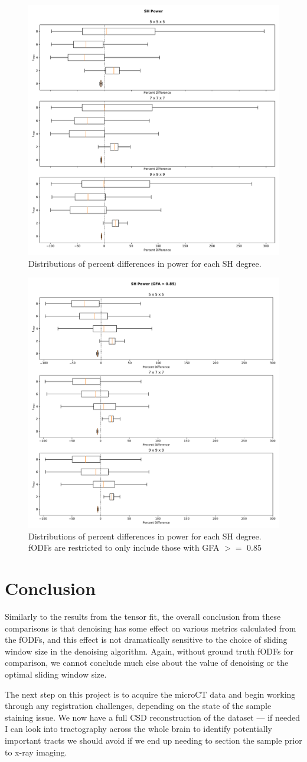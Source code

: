 \documentclass{article}
\begin{document}
\begin{figure}[H]
  \centering
  \includegraphics[width=0.5\linewidth]{../figs/shpower_gfa0}
  \captionsetup{width=0.6\linewidth}
  \caption{Distributions of percent differences in power for each SH degree.}
  \label{fig:shpower0}
\end{figure}

\begin{figure}[H]
  \centering
  \includegraphics[width=0.5\linewidth]{../figs/shpower_gfa85}
  \captionsetup{width=0.6\linewidth}
  \caption{Distributions of percent differences in power for each SH
    degree. fODFs are restricted to only include those with GFA $>=$ 0.85}
  \label{fig:shpower85}
\end{figure}

\section{Conclusion}
Similarly to the results from the tensor fit, the overall conclusion from these
comparisons is that denoising has some effect on various metrics calculated from
the fODFs, and this effect is not dramatically sensitive to the choice of
sliding window size in the denoising algorithm. Again, without ground truth
fODFs for comparison, we cannot conclude much else about the value of denoising
or the optimal sliding window size.

The next step on this project is to acquire the microCT data and begin working
through any registration challenges, depending on the state of the sample
staining issue. We now have a full CSD reconstruction of the dataset --- if
needed I can look into tractography across the whole brain to identify
potentially important tracts we should avoid if we end up needing to section the
sample prior to x-ray imaging.



\end{document}
